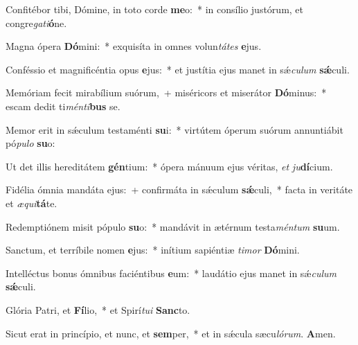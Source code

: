 \item Confitébor tibi, Dómine, in toto corde \textbf{me}o:~* in consílio justórum, et congre\textit{ga}\textit{ti}\textbf{ó}ne.

\item Magna ópera \textbf{Dó}mini:~* exquisíta in omnes volun\textit{tá}\textit{tes} \textbf{e}jus.

\item Conféssio et magnificéntia opus \textbf{e}jus:~* et justítia ejus manet in sǽ\textit{cu}\textit{lum} \textbf{sǽ}culi.

\item Memóriam fecit mirabílium suórum,~+ miséricors et miserátor \textbf{Dó}minus:~* escam dedit ti\textit{mén}\textit{ti}\textbf{bus} se.

\item Memor erit in sǽculum testaménti \textbf{su}i:~* virtútem óperum suórum annuntiábit pó\textit{pu}\textit{lo} \textbf{su}o:

\item Ut det illis hereditátem \textbf{gén}tium:~* ópera mánuum ejus véritas, \textit{et} \textit{ju}\textbf{dí}cium.

\item Fidélia ómnia mandáta ejus:~+ confirmáta in sǽculum \textbf{sǽ}culi,~* facta in veritáte et \textit{æ}\textit{qui}\textbf{tá}te.

\item Redemptiónem misit pópulo \textbf{su}o:~* mandávit in ætérnum testa\textit{mén}\textit{tum} \textbf{su}um.

\item {} Sanctum, et terríbile nomen \textbf{e}jus:~* inítium sapiéntiæ \textit{ti}\textit{mor} \textbf{Dó}mini.

\item Intelléctus bonus ómnibus faciéntibus \textbf{e}um:~* laudátio ejus manet in sǽ\textit{cu}\textit{lum} \textbf{sǽ}culi.

\item Glória Patri, et \textbf{Fí}lio,~* et Spirí\textit{tu}\textit{i} \textbf{Sanc}to.

\item Sicut erat in princípio, et nunc, et \textbf{sem}per,~* et in sǽcula sæcu\textit{ló}\textit{rum}. \textbf{A}men.
